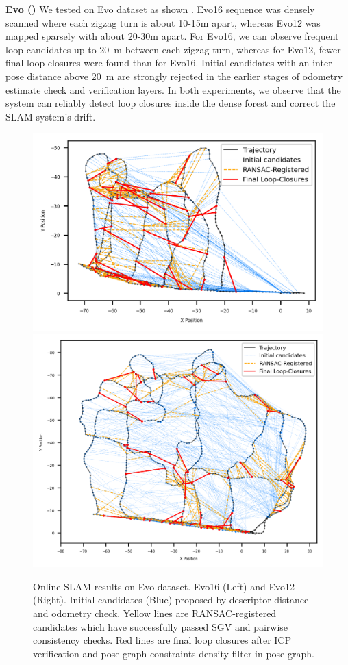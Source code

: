 \textbf{Evo (\textbf{})}\hspace{0.5em} We tested on Evo dataset as shown . Evo16 sequence was densely scanned where each zigzag turn is about 10-15m apart, whereas Evo12 was mapped sparsely with about 20-30m apart. For Evo16, we can observe frequent loop candidates up to \SI{20}{\meter} between each zigzag turn, whereas for Evo12, fewer final loop closures were found than for Evo16. Initial candidates with an inter-pose distance above \SI{20}{\meter} are strongly rejected in the earlier stages of odometry estimate check and verification layers. In both experiments, we observe that the system can reliably detect loop closures inside the dense forest and correct the SLAM system's drift. \vspace{5pt}
\begin{figure}[htbp]
  \centering
  \includegraphics[width=0.53\columnwidth]{pics/exp_2_1_evo16_online2.png}
  \includegraphics[width=0.46\columnwidth]{pics/exp_2_1_evo12_online.png}
  \caption{Online SLAM results on Evo dataset. Evo16 (Left) and Evo12 (Right). Initial candidates (Blue) proposed by descriptor distance and odometry check. Yellow lines are RANSAC-registered candidates which have successfully passed SGV and pairwise consistency checks. Red lines are final loop closures after ICP verification and pose graph constraints density filter in pose graph.}
  \label{fig:exp_2_1_evo_online}
\end{figure}

